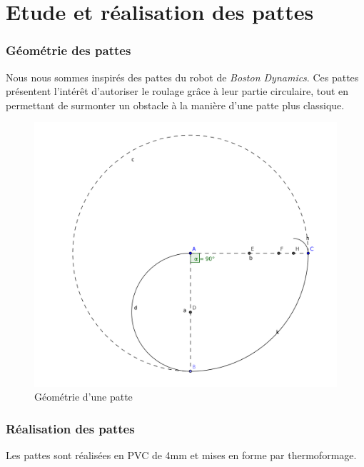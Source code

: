 \documentclass[12pt,french,a4paper]{article}
\begin{document}
\part{Etude et réalisation des pattes}

\section{Géométrie des pattes}
Nous nous sommes inspirés des pattes du robot de \emph{Boston Dynamics}. Ces pattes présentent l'intérêt d'autoriser le roulage grâce à leur partie circulaire, tout en permettant de surmonter un obstacle à la manière d'une patte plus classique.

\begin{figure}[h!]
	\centering
	\includegraphics[width=\textwidth/2]{images/patteSchema.png}
	\caption[geometrie]{\label{fig:geometrie_patte} Géométrie d'une patte}
\end{figure}

\section{Réalisation des pattes}

Les pattes sont réalisées en PVC de 4mm et mises en forme par thermoformage. 
\end{document}
